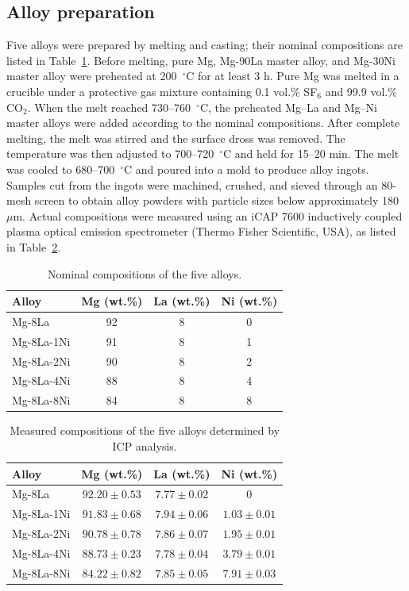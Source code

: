 \documentclass[preprint,12pt]{elsarticle}
\begin{document}
\subsection{Alloy preparation}
Five alloys were prepared by melting and casting; their nominal compositions are listed in Table~\ref{tab:1}. Before melting, pure Mg, Mg-90La master alloy, and Mg-30Ni master alloy were preheated at 200~$^{\circ}$C for at least 3 h. Pure Mg was melted in a crucible under a protective gas mixture containing 0.1 vol.\% SF$_6$ and 99.9 vol.\% CO$_2$. When the melt reached 730--760~$^{\circ}$C, the preheated Mg--La and Mg--Ni master alloys were added according to the nominal compositions. After complete melting, the melt was stirred and the surface dross was removed. The temperature was then adjusted to 700--720~$^{\circ}$C and held for 15--20 min. The melt was cooled to 680--700~$^{\circ}$C and poured into a mold to produce alloy ingots. Samples cut from the ingots were machined, crushed, and sieved through an 80-mesh screen to obtain alloy powders with particle sizes below approximately 180~$\mu$m. Actual compositions were measured using an iCAP 7600 inductively coupled plasma optical emission spectrometer (Thermo Fisher Scientific, USA), as listed in Table~\ref{tab:2}.

\begin{table}[htbp]\centering
\caption{Nominal compositions of the five alloys.}\label{tab:1}
\begin{tabular}{lccc}\toprule
Alloy & Mg (wt.\%) & La (wt.\%) & Ni (wt.\%) \\\midrule
Mg-8La & 92 & 8 & 0 \\
Mg-8La-1Ni & 91 & 8 & 1 \\
Mg-8La-2Ni & 90 & 8 & 2 \\
Mg-8La-4Ni & 88 & 8 & 4 \\
Mg-8La-8Ni & 84 & 8 & 8 \\\bottomrule
\end{tabular}\end{table}

\begin{table}[htbp]\centering
\caption{Measured compositions of the five alloys determined by ICP analysis.}\label{tab:2}
\begin{tabular}{lccc}\toprule
Alloy & Mg (wt.\%) & La (wt.\%) & Ni (wt.\%) \\\midrule
Mg-8La & $92.20\pm0.53$ & $7.77\pm0.02$ & 0 \\
Mg-8La-1Ni & $91.83\pm0.68$ & $7.94\pm0.06$ & $1.03\pm0.01$ \\
Mg-8La-2Ni & $90.78\pm0.78$ & $7.86\pm0.07$ & $1.95\pm0.01$ \\
Mg-8La-4Ni & $88.73\pm0.23$ & $7.78\pm0.04$ & $3.79\pm0.01$ \\
Mg-8La-8Ni & $84.22\pm0.82$ & $7.85\pm0.05$ & $7.91\pm0.03$ \\\bottomrule
\end{tabular}\end{table}
\end{document}

